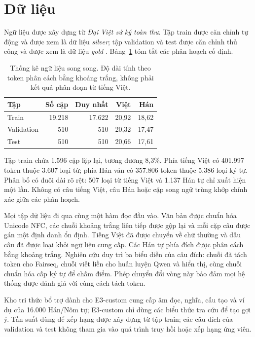 \documentclass[11pt,twocolumn]{article}
\begin{document}
\section{Dữ liệu}

Ngữ liệu được xây dựng từ \textit{Đại Việt sử ký toàn thư}. Tập train được căn
chỉnh tự động và được xem là dữ liệu \textit{silver}; tập validation và test
được căn chỉnh thủ công và được xem là dữ liệu \textit{gold}
\citep{projectspec2026}. Bảng~\ref{tab:data} tóm tắt các phân hoạch cố định.

\begin{table}[t]
\centering
\small
\caption{Thống kê ngữ liệu song song. Độ dài tính theo token phân cách bằng
khoảng trắng, không phải kết quả phân đoạn từ tiếng Việt.}
\label{tab:data}
\begin{tabular}{lrrrr}
\toprule
Tập & Số cặp & Duy nhất & Việt & Hán \\
\midrule
Train & 19.218 & 17.622 & 20,92 & 18,62 \\
Validation & 510 & 510 & 20,32 & 17,47 \\
Test & 510 & 510 & 20,66 & 17,61 \\
\bottomrule
\end{tabular}
\end{table}

Tập train chứa 1.596 cặp lặp lại, tương đương 8,3\%. Phía tiếng Việt có
401.997 token thuộc 3.607 loại từ; phía Hán văn có 357.806 token thuộc 5.386
loại ký tự. Phân bố có đuôi dài rõ rệt: 507 loại từ tiếng Việt và 1.137 Hán tự
chỉ xuất hiện một lần. Không có câu tiếng Việt, câu Hán hoặc cặp song ngữ trùng
khớp chính xác giữa các phân hoạch.

Mọi tập dữ liệu đi qua cùng một hàm đọc đầu vào. Văn bản được chuẩn hóa Unicode
NFC, các chuỗi khoảng trắng liên tiếp được gộp lại và mỗi cặp câu được gán một
định danh ổn định. Tiếng Việt đã được chuyển về chữ thường và dấu câu đã được
loại khỏi ngữ liệu cung cấp. Các Hán tự phía đích được phân cách bằng khoảng
trắng. Nghiên cứu duy trì ba biểu diễn của câu đích: chuỗi đã tách token cho
Fairseq, chuỗi viết liền cho huấn luyện Qwen và hiển thị, cùng chuỗi chuẩn hóa
cấp ký tự để chấm điểm. Phép chuyển đổi vòng này bảo đảm mọi hệ thống được đánh
giá với cùng cách tách token.

Kho tri thức bổ trợ dành cho E3-custom cung cấp âm đọc, nghĩa, cấu tạo và ví dụ
của 16.000 Hán/Nôm tự; E3-custom chỉ dùng các biểu thức tra cứu để tạo gợi ý.
Tần suất dùng để xếp hạng được xây dựng từ tập train; các câu đích của validation và test không tham gia
vào quá trình truy hồi hoặc xếp hạng ứng viên.
\end{document}
